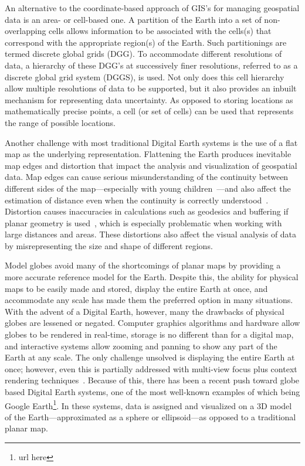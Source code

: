 An alternative to the coordinate-based approach of GIS's for managing geospatial data is an area- or cell-based one.
A partition of the Earth into a set of non-overlapping cells allows information to be associated with the cells(s) that correspond with the appropriate region(s) of the Earth.
Such partitionings are termed discrete global grids (DGG).
To accommodate different resolutions of data, a hierarchy of these DGG's at successively finer resolutions, referred to as a discrete global grid system (DGGS), is used.
Not only does this cell hierarchy allow multiple resolutions of data to be supported, but it also provides an inbuilt mechanism for representing data uncertainty.
As opposed to storing locations as mathematically precise points, a cell (or set of cells) can be used that represents the range of possible locations.


Another challenge with most traditional Digital Earth systems is the use of a flat map as the underlying representation.
Flattening the Earth produces inevitable map edges and distortion that impact the analysis and visualization of geospatial data.
Map edges can cause serious misunderstanding of the continuity between different sides of the map---especially with young children~\cite{hennerdal2015beyond}---and also affect the estimation of distance even when the continuity is correctly understood~\cite{hruby2016journey}.
Distortion causes inaccuracies in calculations such as geodesics and buffering if planar geometry is used~\cite{flaterbuffering}, which is especially problematic when working with large distances and areas.
These distortions also affect the visual analysis of data by misrepresenting the size and shape of different regions.


Model globes avoid many of the shortcomings of planar maps by providing a more accurate reference model for the Earth.
Despite this, the ability for physical maps to be easily made and stored, display the entire Earth at once, and accommodate any scale has made them the preferred option in many situations.
With the advent of a Digital Earth, however, many the drawbacks of physical globes are lessened or negated.
Computer graphics algorithms and hardware allow globes to be rendered in real-time, storage is no different than for a digital map, and interactive systems allow zooming and panning to show any part of the Earth at any scale.
The only challenge unsolved is displaying the entire Earth at once; however, even this is partially addressed with multi-view focus plus context rendering techniques~\cite{mark-sherlock}.
Because of this, there has been a recent push toward globe based Digital Earth systems, one of the most well-known examples of which being Google Earth\footnote{url here}.
In these systems, data is assigned and visualized on a 3D model of the Earth---approximated as a sphere or ellipsoid---as opposed to a traditional planar map.

